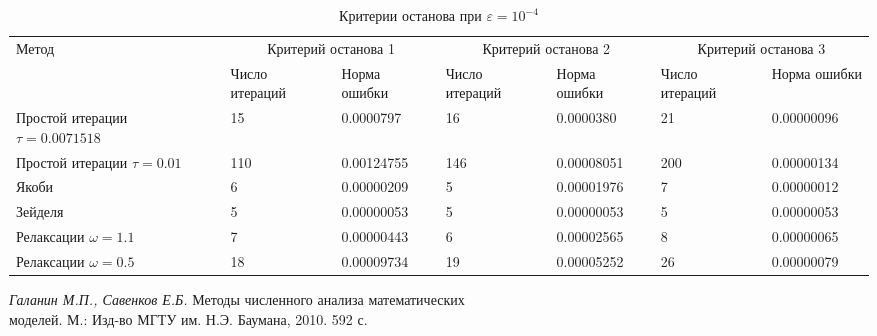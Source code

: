 \documentclass[12pt, a4paper]{article}
\begin{document}
	\begin{table}[h]
		\caption{Критерии останова при $\varepsilon=10^{-4}$}
		\footnotesize
		\begin{tabular}{|p{4.3 cm}|p{1.49cm}|p{1.7cm}|p{1.49cm}|p{1.7cm}|p{1.49cm}|p{1.7cm}|}
			\hline
			\multirow{2}{4em}{Метод} &\multicolumn{2}{c|}{Критерий останова 1} & \multicolumn{2}{c|}{Критерий останова 2} & \multicolumn{2}{c|}{Критерий останова 3} \\
			\cline{2-7}
			&Число итераций&Норма ошибки&Число итераций&Норма ошибки&Число итераций&Норма ошибки\\
			\hline
			Простой итерации $\tau=0.0071518$ &15&0.0000797&16&0.0000380&21&0.00000096\\
			\hline
			Простой итерации $\tau= 0.01$ &110& 0.00124755&146&0.00008051&\large{200}&0.00000134\\
			\hline
			Якоби &6& 0.00000209&5&0.00001976&7&0.00000012\\
			\hline
			Зейделя &5&0.00000053&5& 0.00000053&5&0.00000053\\
			\hline
			Релаксации $\omega=1.1$ &7&0.00000443&6& 0.00002565&8& 0.00000065\\
			\hline
			Релаксации $\omega=0.5$ &18&0.00009734&19&0.00005252&26&0.00000079\\
			\hline
		\end{tabular}
	\end{table}
	
	
	
	
	\newpage
	\begin{thebibliography}{1}
		 \textit{Галанин М.П., Савенков Е.Б.} Методы численного анализа математических\\ моделей. М.: Изд-во МГТУ им. Н.Э. Баумана,	2010. 592 с.
		
		
	\end{thebibliography}
	
	
\end{document}
